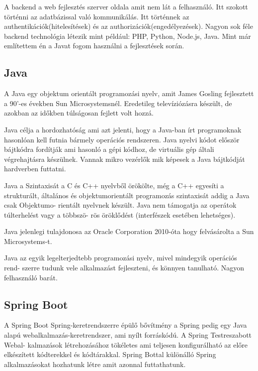 

A backend a web fejlesztés szerver oldala amit nem lát a felhasználó. Itt szokott történni az adatbázissal való kommunikálás. Itt történnek az authentikációk(hitelesítések) és az authorizációk(engedélyezések). Nagyon sok féle backend technológia létezik mint például: PHP, Python, Node.js, Java. Mint már említettem én a Javat fogom használni a fejlesztések során.

\subsection{Java}

A Java egy objektum orientált programozási nyelv, amit James Gosling fejlesztett a 90’-es években Sun Microsystemsnél. Eredetileg televíziózásra készült, de azokban az időkben túlságosan fejlett volt hozzá.

Java célja a hordozhatóság ami azt jelenti, hogy a Java-ban írt programoknak hasonlóan kell futnia bármely operációs rendszeren. Java nyelvi kódot először bájtkódra fordítják ami hasonló a gépi kódhoz, de virtuális gép általi végrehajtásra készülnek. Vannak mikro vezérlők mik képesek a Java bájtkódját hardverben futtatni.

Java a Szintaxisát a C és C++ nyelvből örökölte, még a C++ egyesíti a strukturált, általános és objektumorientált programozás szintaxisát addig a Java csak Objektumo-
rientált nyelvnek készült. Java nem támogatja az operátok túlterhelést vagy a többszö-
rös öröklődést (interfészek esetében lehetséges).

Java jelenlegi tulajdonosa az Oracle Corporation 2010-óta hogy felvásárolta a Sun Microsystems-t.

Java az egyik legelterjedtebb programozási nyelv, mivel mindegyik operációs rend-
szerre tudunk vele alkalmazást fejleszteni, és könnyen tanulható. Nagyon felhasználó barát.\cite{Java}

\subsection{Spring Boot}

A Spring Boot Spring-keretrendszerre épülő bővítmény a Spring pedig egy Java alapú webalkalmazás-keretrendszer, ami nyílt forráskódú. A Spring Testreszabott Webal-
kalmazások létrehozásához tökéletes ami teljesen konfigurálható az előre elkészített kódterekkel és kódtárakkal. Spring Bottal különálló Spring alkalmazásokat hozhatunk létre amit azonnal futtathatunk.

